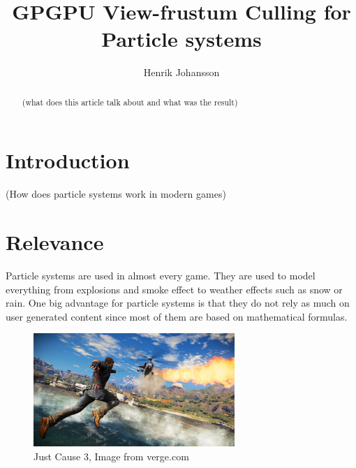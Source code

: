 \documentclass{acmsiggraph}
\title{GPGPU View-frustum Culling for Particle systems}
\author{Henrik Johansson}
\begin{document}


\maketitle

\begin{abstract}

(what does this article talk about and what was the result)

\end{abstract}



\keywordlist

\section{Introduction}

(How does particle systems work in modern games)

\section{Relevance}

Particle systems are used in almost every game. They are used to model everything from explosions and smoke effect to weather effects such as snow or rain. One big advantage for particle systems is that they do not rely as much on user generated content since most of them are based on mathematical formulas. 

\begin{figure}[ht]
  \centering
  \includegraphics[width=3.0in]{images/jc3.jpg}
  \caption{Just Cause 3, Image from verge.com}
  \label{fig:ferrari}
\end{figure}
\end{document}
